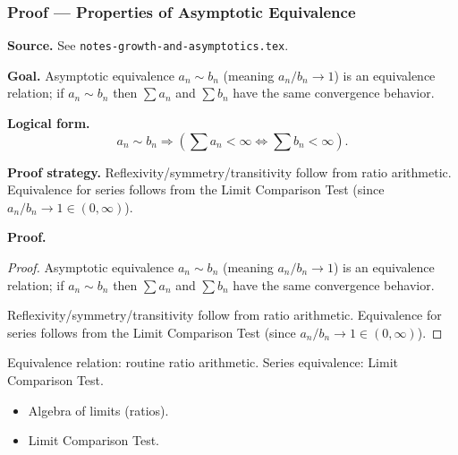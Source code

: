 
\clearpage
{}
\hypertarget{proof-RA-ABB-T-asymptotic-equiv-props}{}

\subsubsection[Properties of Asymptotic Equivalence]{Proof --- Properties of Asymptotic Equivalence}

\bigskip

\noindent
\textbf{Source.} See \texttt{notes-growth-and-asymptotics.tex}.

\vspace{0.75em}

\noindent
\textbf{Goal.} Asymptotic equivalence $a_n \sim b_n$ (meaning $a_n/b_n \to 1$) is an equivalence relation; if $a_n \sim b_n$ then $\sum a_n$ and $\sum b_n$ have the same convergence behavior.

\vspace{0.75em}

\noindent
\textbf{Logical form.}
\[
  a_n \sim b_n \Rightarrow (\sum a_n < \infty \Longleftrightarrow \sum b_n < \infty).
\]

\vspace{0.75em}

\noindent
\textbf{Proof strategy.} Reflexivity/symmetry/transitivity follow from ratio arithmetic. Equivalence for series follows from the Limit Comparison Test (since $a_n/b_n \to 1 \in (0,\infty)$).

\vspace{0.75em}

\noindent
\textbf{Proof.}
\begin{proof}
\Claim Asymptotic equivalence $a_n \sim b_n$ (meaning $a_n/b_n \to 1$) is an equivalence relation; if $a_n \sim b_n$ then $\sum a_n$ and $\sum b_n$ have the same convergence behavior.

\Given 

\Goal 

\Strategy Reflexivity/symmetry/transitivity follow from ratio arithmetic. Equivalence for series follows from the Limit Comparison Test (since $a_n/b_n \to 1 \in (0,\infty)$).

\medskip


\end{proof}

\begin{remark*}
Equivalence relation: routine ratio arithmetic. Series equivalence: Limit Comparison Test.
\end{remark*}

\begin{remark*}[Dependencies]
\begin{itemize}
  \item Algebra of limits (ratios).
  \item Limit Comparison Test.
\end{itemize}
\end{remark*}
